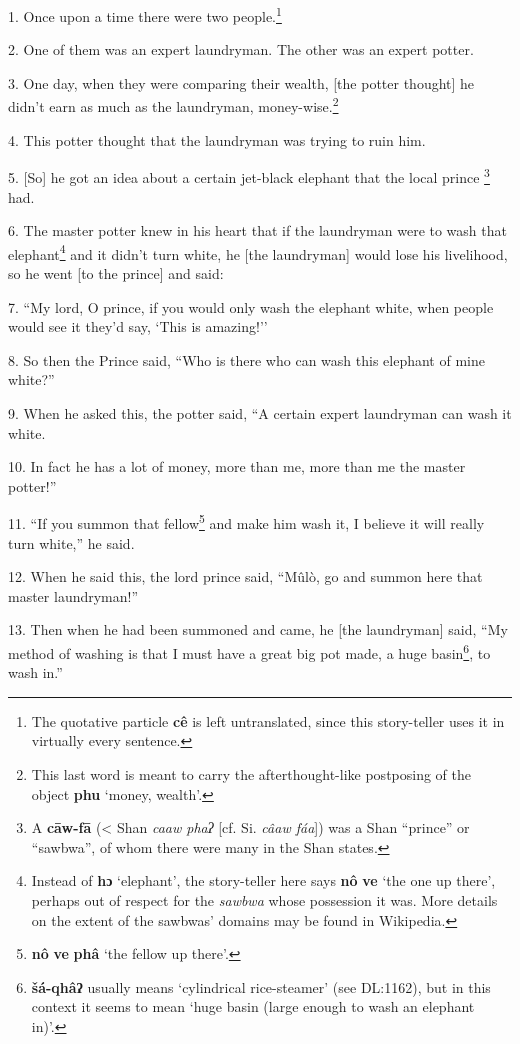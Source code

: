 \setcounter{footnote}{0}

1. Once upon a time there were two people.\footnote{The quotative particle \textbf{cê} is left untranslated, since this story-teller uses it in virtually every sentence.}

2. One of them was an expert laundryman. The other was an expert potter.

3. One day, when they were comparing their wealth, [the potter thought] he didn't
earn as much as the laundryman, money-wise.\footnote{This last word is meant to carry the afterthought-like postposing of the object \textbf{phu} `money, wealth'.}

4. This potter thought that the laundryman was trying to ruin him.

5. [So] he got an idea about a certain jet-black elephant that the local prince
\footnote{A \textbf{cāw-fā} (< Shan \textit{caaw phaʔ} [cf. Si. \textit{câaw fáa}]) was a Shan ``prince'' or ``sawbwa'', of whom there were many in the Shan states.} had.

6. The master potter knew in his heart that if the laundryman were to wash that
elephant\footnote{Instead of \textbf{hɔ} `elephant', the story-teller here says \textbf{nô} \textbf{ve} `the one up there', perhaps out of respect for the \textit{sawbwa} whose possession it was. More details on the extent of the sawbwas' domains may be found in Wikipedia.} and it didn't turn white, he [the laundryman] would lose his livelihood,
so he went [to the prince] and said:

7. ``My lord, O prince, if you would only wash the elephant white, when people
would see it they'd say, `This is amazing!''

8. So then the Prince said, ``Who is there who can wash this elephant of mine white?''

9. When he asked this, the potter said, ``A certain expert laundryman can wash
it white.

10. In fact he has a lot of money, more than me, more than me the master potter!''

11. ``If you summon that fellow\footnote{\textbf{nô} \textbf{ve} \textbf{phâ} `the fellow up there'.} and make him wash it, I believe it will really
turn white,'' he said.

12. When he said this, the lord prince said, ``Mûlò, go and summon here that
master laundryman!''

13. Then when he had been summoned and came, he [the laundryman] said, ``My method
of washing is that I must have a great big pot made, a huge basin\footnote{\textbf{šá-qhâʔ} usually means `cylindrical rice-steamer' (see DL:1162), but in this context it seems to mean `huge basin (large enough to wash an elephant in)'.}, to wash
in.''


